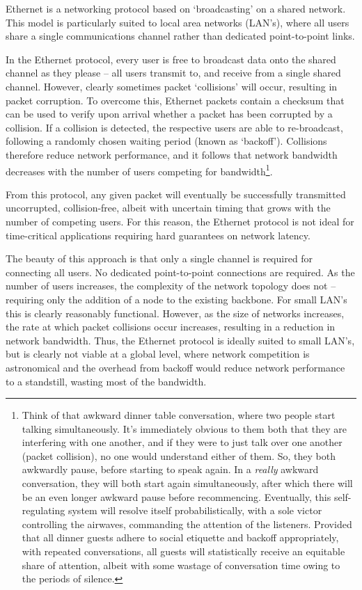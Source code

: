 \documentclass[aps,rmp,twocolumn,amsmath,amssymb,nofootinbib,superscriptaddress,longbibliography,floatfix]{revtex4-1}
\begin{document}
Ethernet is a networking protocol based on `broadcasting' on a shared network. This model is particularly suited to local area networks (LAN's), where all users share a single communications channel rather than dedicated point-to-point links.

In the Ethernet protocol, every user is free to broadcast data onto the shared channel as they please -- all users transmit to, and receive from a single shared channel. However, clearly sometimes packet `collisions' will occur, resulting in packet corruption. To overcome this, Ethernet packets contain a checksum that can be used to verify upon arrival whether a packet has been corrupted by a collision. If a collision is detected, the respective users are able to re-broadcast, following a randomly chosen waiting period (known as `backoff'). Collisions therefore reduce network performance, and it follows that network bandwidth decreases with the number of users competing for bandwidth\footnote{Think of that awkward dinner table conversation, where two people start talking simultaneously. It's immediately obvious to them both that they are interfering with one another, and if they were to just talk over one another (packet collision), no one would understand either of them. So, they both awkwardly pause, before starting to speak again. In a \emph{really} awkward conversation, they will both start again simultaneously, after which there will be an even longer awkward pause before recommencing. Eventually, this self-regulating system will resolve itself probabilistically, with a sole victor controlling the airwaves, commanding the attention of the listeners. Provided that all dinner guests adhere to social etiquette and backoff appropriately, with repeated conversations, all guests will statistically receive an equitable share of attention, albeit with some wastage of conversation time owing to the periods of silence.}.

From this protocol, any given packet will eventually be successfully transmitted uncorrupted, collision-free, albeit with uncertain timing that grows with the number of competing users. For this reason, the Ethernet protocol is not ideal for time-critical applications requiring hard guarantees on network latency.

The beauty of this approach is that only a single channel is required for connecting all users. No dedicated point-to-point connections are required. As the number of users increases, the complexity of the network topology does not -- requiring only the addition of a node to the existing backbone. For small LAN's this is clearly reasonably functional. However, as the size of networks increases, the rate at which packet collisions occur increases, resulting in a reduction in network bandwidth. Thus, the Ethernet protocol is ideally suited to small LAN's, but is clearly not viable at a global level, where network competition is astronomical and the overhead from backoff would reduce network performance to a standstill, wasting most of the bandwidth.
\end{document}
